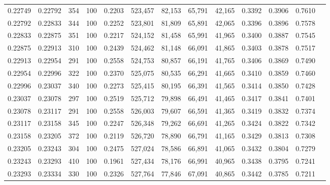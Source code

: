 \begin{tabular}{rrrrrrrrrrrrr}
0.22749 & 0.22792 &   354 & 100 &                                     0.2203 & 523,457 &  82,153 &  65,791 &  42,165 & 0.3392 & 0.3906 & 0.7610 \\
0.22792 & 0.22833 &   344 & 100 &                                     0.2252 & 523,801 &  81,809 &  65,891 &  42,065 & 0.3396 & 0.3896 & 0.7578 \\
0.22833 & 0.22875 &   351 & 100 &                                     0.2217 & 524,152 &  81,458 &  65,991 &  41,965 & 0.3400 & 0.3887 & 0.7545 \\
0.22875 & 0.22913 &   310 & 100 &                                     0.2439 & 524,462 &  81,148 &  66,091 &  41,865 & 0.3403 & 0.3878 & 0.7517 \\
0.22913 & 0.22954 &   291 & 100 &                                     0.2558 & 524,753 &  80,857 &  66,191 &  41,765 & 0.3406 & 0.3869 & 0.7490 \\
0.22954 & 0.22996 &   322 & 100 &                                     0.2370 & 525,075 &  80,535 &  66,291 &  41,665 & 0.3410 & 0.3859 & 0.7460 \\
0.22996 & 0.23037 &   340 & 100 &                                     0.2273 & 525,415 &  80,195 &  66,391 &  41,565 & 0.3414 & 0.3850 & 0.7428 \\
0.23037 & 0.23078 &   297 & 100 &                                     0.2519 & 525,712 &  79,898 &  66,491 &  41,465 & 0.3417 & 0.3841 & 0.7401 \\
0.23078 & 0.23117 &   291 & 100 &                                     0.2558 & 526,003 &  79,607 &  66,591 &  41,365 & 0.3419 & 0.3832 & 0.7374 \\
0.23117 & 0.23158 &   345 & 100 &                                     0.2247 & 526,348 &  79,262 &  66,691 &  41,265 & 0.3424 & 0.3822 & 0.7342 \\
0.23158 & 0.23205 &   372 & 100 &                                     0.2119 & 526,720 &  78,890 &  66,791 &  41,165 & 0.3429 & 0.3813 & 0.7308 \\
0.23205 & 0.23243 &   304 & 100 &                                     0.2475 & 527,024 &  78,586 &  66,891 &  41,065 & 0.3432 & 0.3804 & 0.7279 \\
0.23243 & 0.23293 &   410 & 100 &                                     0.1961 & 527,434 &  78,176 &  66,991 &  40,965 & 0.3438 & 0.3795 & 0.7241 \\
0.23293 & 0.23334 &   330 & 100 &                                     0.2326 & 527,764 &  77,846 &  67,091 &  40,865 & 0.3442 & 0.3785 & 0.7211 \\

\end{tabular}
